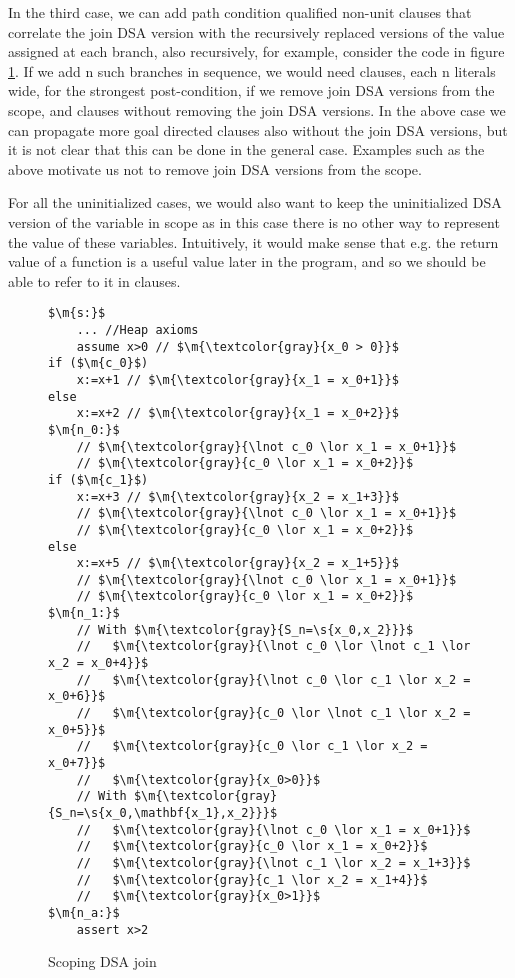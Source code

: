 In the third case, we can add path condition qualified non-unit clauses that correlate the join DSA version with the recursively replaced versions of the value assigned at each branch, also recursively, for example, consider the code in figure \ref{snippet4.2.5}.
If we add n such branches in sequence, we would need  clauses, each n literals wide, for the strongest post-condition, if we remove join DSA versions from the scope, and  clauses without removing the join DSA versions.
In the above case we can propagate more goal directed clauses also without the join DSA versions, but it is not clear that this can be done in the general case. Examples such as the above motivate us not to remove join DSA versions from the scope.

For all the uninitialized cases, we would also want to keep the uninitialized DSA version of the variable in scope as in this case there is no other way to represent the value of these variables. 
Intuitively, it would make sense that e.g. the return value of a function is a useful value later in the program, and so we should be able to refer to it in clauses.

\begin{figure}[H]
\begin{lstlisting}
$\m{s:}$
	... //Heap axioms
	assume x>0 // $\m{\textcolor{gray}{x_0 > 0}}$
if ($\m{c_0}$)
	x:=x+1 // $\m{\textcolor{gray}{x_1 = x_0+1}}$
else
	x:=x+2 // $\m{\textcolor{gray}{x_1 = x_0+2}}$
$\m{n_0:}$
	// $\m{\textcolor{gray}{\lnot c_0 \lor x_1 = x_0+1}}$
	// $\m{\textcolor{gray}{c_0 \lor x_1 = x_0+2}}$
if ($\m{c_1}$)
	x:=x+3 // $\m{\textcolor{gray}{x_2 = x_1+3}}$
	// $\m{\textcolor{gray}{\lnot c_0 \lor x_1 = x_0+1}}$
	// $\m{\textcolor{gray}{c_0 \lor x_1 = x_0+2}}$
else
	x:=x+5 // $\m{\textcolor{gray}{x_2 = x_1+5}}$
	// $\m{\textcolor{gray}{\lnot c_0 \lor x_1 = x_0+1}}$
	// $\m{\textcolor{gray}{c_0 \lor x_1 = x_0+2}}$
$\m{n_1:}$
	// With $\m{\textcolor{gray}{S_n=\s{x_0,x_2}}}$
	//   $\m{\textcolor{gray}{\lnot c_0 \lor \lnot c_1 \lor x_2 = x_0+4}}$
	//   $\m{\textcolor{gray}{\lnot c_0 \lor c_1 \lor x_2 = x_0+6}}$
	//   $\m{\textcolor{gray}{c_0 \lor \lnot c_1 \lor x_2 = x_0+5}}$
	//   $\m{\textcolor{gray}{c_0 \lor c_1 \lor x_2 = x_0+7}}$
	//   $\m{\textcolor{gray}{x_0>0}}$
	// With $\m{\textcolor{gray}{S_n=\s{x_0,\mathbf{x_1},x_2}}}$
	//   $\m{\textcolor{gray}{\lnot c_0 \lor x_1 = x_0+1}}$
	//   $\m{\textcolor{gray}{c_0 \lor x_1 = x_0+2}}$
	//   $\m{\textcolor{gray}{\lnot c_1 \lor x_2 = x_1+3}}$
	//   $\m{\textcolor{gray}{c_1 \lor x_2 = x_1+4}}$
	//   $\m{\textcolor{gray}{x_0>1}}$
$\m{n_a:}$
	assert x>2
\end{lstlisting}
\caption{Scoping DSA join}
\label{snippet4.2.5}
\end{figure}


